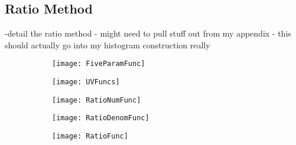 







\subsection{Ratio Method}

-detail the ratio method - might need to pull stuff out from my appendix - this should actually go into my histogram construction really


    \begin{figure}[]
    \centering
        \begin{subfigure}[t]{0.45\textwidth}
            \centering
            \texttt{[image: FiveParamFunc]}
            \caption{}
        \end{subfigure}%

        \vspace{2mm}
        \begin{subfigure}[t]{0.45\textwidth}
            \centering
            \texttt{[image: UVFuncs]}
            \caption{}
        \end{subfigure}
        \begin{subfigure}[t]{0.45\textwidth}
            \centering
            \texttt{[image: RatioNumFunc]}
            \caption{}
        \end{subfigure}%
        \vspace{2mm}
        \begin{subfigure}[t]{0.45\textwidth}
            \centering
            \texttt{[image: RatioDenomFunc]}
            \caption{}
        \end{subfigure}
        \begin{subfigure}[t]{0.45\textwidth}
            \centering
            \texttt{[image: RatioFunc]}
            \caption{}
        \end{subfigure}%
    \caption[]{}
    \label{}
    \end{figure}



